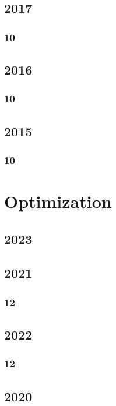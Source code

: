 \documentclass[11pt]{book}
\begin{document}
\section{2017}
\subsection{10}






\section{2016}
\subsection{10}

\section{2015}
\subsection{10}






\chapter{Optimization}
\section{2023}

\section{2021}
\subsection{12}

\section{2022}
\subsection{12}

\section{2020}
\end{document}

